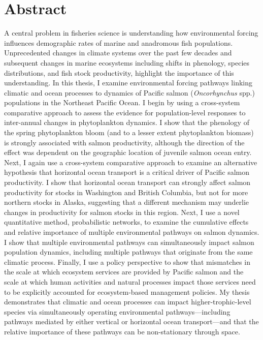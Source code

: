 %
%
%


\chapter*{Abstract}


A central problem in fisheries science is understanding how environmental
forcing influences demographic rates of marine and anadromous fish populations.
Unprecedented changes in climate systems over the past few decades and
subsequent changes in marine ecosystems including shifts in phenology, species
distributions, and fish stock productivity, highlight the importance of this
understanding. In this thesis, I examine environmental forcing pathways linking
climatic and ocean processes to dynamics of Pacific salmon
(\textit{Oncorhynchus} spp.) populations in the Northeast Pacific Ocean. I begin
by using a cross-system comparative approach to assess the evidence for
population-level responses to inter-annual changes in phytoplankton dynamics. I
show that the phenology of the spring phytoplankton bloom (and to a lesser
extent phytoplankton biomass) is strongly associated with salmon productivity,
although the direction of the effect was dependent on the geographic location of
juvenile salmon ocean entry. Next, I again use a cross-system comparative
approach to examine an alternative hypothesis that horizontal ocean transport is
a critical driver of Pacific salmon productivity. I show that horizontal ocean
transport can strongly affect salmon productivity for stocks in Washington and
British Columbia, but not for more northern stocks in Alaska, suggesting that a
different mechanism may underlie changes in productivity for salmon stocks in
this region. Next, I use a novel quantitative method, probabilistic networks, to
examine the cumulative effects and relative importance of multiple environmental
pathways on salmon dynamics. I show that multiple environmental pathways can
simultaneously impact salmon population dynamics, including multiple pathways
that originate from the same climatic process. Finally, I use a policy
perspective to show that mismatches in the scale at which ecosystem services are
provided by Pacific salmon and the scale at which human activities and natural
processes impact those services need to be explicitly accounted for
ecosystem-based management policies. My thesis demonstrates that climatic and
ocean processes can impact higher-trophic-level species via simultaneously
operating environmental pathways---including pathways mediated by either
vertical or horizontal ocean transport---and that the relative importance of
these pathways can be non-stationary through space.
